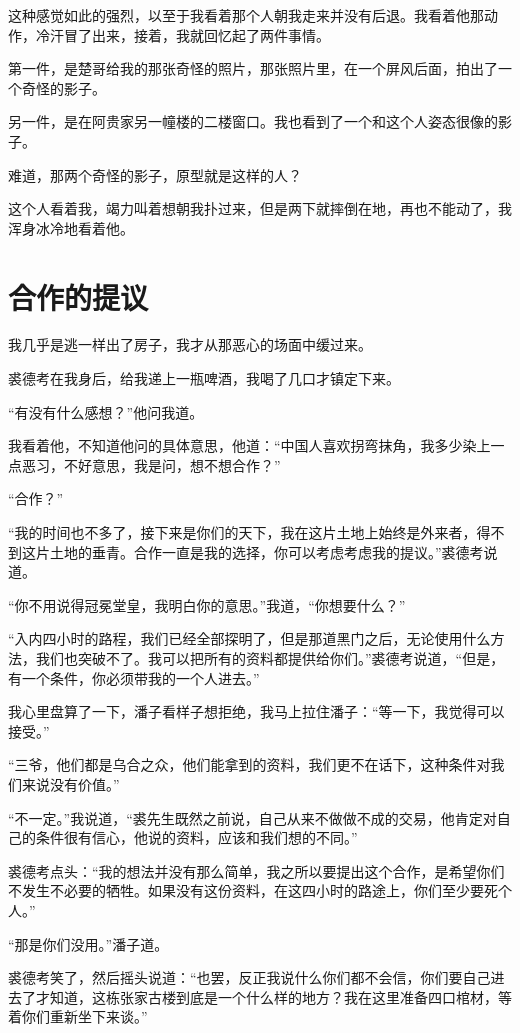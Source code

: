 这种感觉如此的强烈，以至于我看着那个人朝我走来并没有后退。我看着他那动作，冷汗冒了出来，接着，我就回忆起了两件事情。

第一件，是楚哥给我的那张奇怪的照片，那张照片里，在一个屏风后面，拍出了一个奇怪的影子。

另一件，是在阿贵家另一幢楼的二楼窗口。我也看到了一个和这个人姿态很像的影子。

难道，那两个奇怪的影子，原型就是这样的人？

这个人看着我，竭力叫着想朝我扑过来，但是两下就摔倒在地，再也不能动了，我浑身冰冷地看着他。

\chapter{合作的提议}

我几乎是逃一样出了房子，我才从那恶心的场面中缓过来。

裘德考在我身后，给我递上一瓶啤酒，我喝了几口才镇定下来。

“有没有什么感想？”他问我道。

我看着他，不知道他问的具体意思，他道：“中国人喜欢拐弯抹角，我多少染上一点恶习，不好意思，我是问，想不想合作？”

“合作？”

“我的时间也不多了，接下来是你们的天下，我在这片土地上始终是外来者，得不到这片土地的垂青。合作一直是我的选择，你可以考虑考虑我的提议。”裘德考说道。

“你不用说得冠冕堂皇，我明白你的意思。”我道，“你想要什么？”

“入内四小时的路程，我们已经全部探明了，但是那道黑门之后，无论使用什么方法，我们也突破不了。我可以把所有的资料都提供给你们。”裘德考说道，“但是，有一个条件，你必须带我的一个人进去。”

我心里盘算了一下，潘子看样子想拒绝，我马上拉住潘子：“等一下，我觉得可以接受。”

“三爷，他们都是乌合之众，他们能拿到的资料，我们更不在话下，这种条件对我们来说没有价值。”

“不一定。”我说道，“裘先生既然之前说，自己从来不做做不成的交易，他肯定对自己的条件很有信心，他说的资料，应该和我们想的不同。”

裘德考点头：“我的想法并没有那么简单，我之所以要提出这个合作，是希望你们不发生不必要的牺牲。如果没有这份资料，在这四小时的路途上，你们至少要死个人。”

“那是你们没用。”潘子道。

裘德考笑了，然后摇头说道：“也罢，反正我说什么你们都不会信，你们要自己进去了才知道，这栋张家古楼到底是一个什么样的地方？我在这里准备四口棺材，等着你们重新坐下来谈。”

